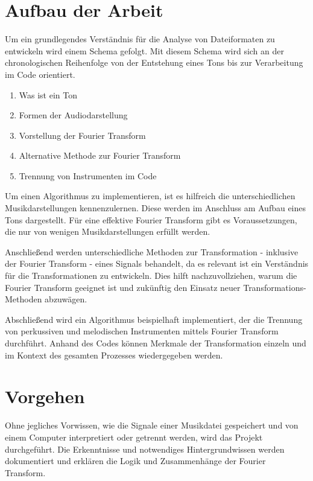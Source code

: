%
\section{Aufbau der Arbeit}
%

Um ein grundlegendes Verständnis für die Analyse von Dateiformaten zu entwickeln wird einem Schema gefolgt.
Mit diesem Schema wird sich an der chronologischen Reihenfolge von der Entstehung eines Tons bis zur Verarbeitung im Code orientiert.

%
\begin{enumerate}
    \item Was ist ein Ton
    \item Formen der Audiodarstellung
    \item Vorstellung der Fourier Transform
    \item Alternative Methode zur Fourier Transform
    \item Trennung von Instrumenten im Code
\end{enumerate}
%

Um einen Algorithmus zu implementieren, ist es hilfreich die unterschiedlichen Musikdarstellungen kennenzulernen.
Diese werden im Anschluss am Aufbau eines Tons dargestellt.
Für eine effektive Fourier Transform gibt es Voraussetzungen, die nur von wenigen Musikdarstellungen erfüllt werden.

\par

Anschließend werden unterschiedliche Methoden zur Transformation - inklusive der Fourier Transform - eines Signals behandelt, da es relevant ist ein Verständnis für die Transformationen zu entwickeln. Dies hilft nachzuvollziehen, warum die Fourier Transform geeignet ist und zukünftig den Einsatz neuer Transformations-Methoden abzuwägen.

\par

Abschließend wird ein Algorithmus beispielhaft implementiert, der die Trennung von perkussiven und melodischen Instrumenten mittels Fourier Transform durchführt. Anhand des Codes können Merkmale der Transformation einzeln und im Kontext des gesamten Prozesses wiedergegeben werden.

%
\section{Vorgehen}
%

Ohne jegliches Vorwissen, wie die Signale einer Musikdatei gespeichert und von einem Computer interpretiert oder getrennt werden, wird das Projekt durchgeführt. Die Erkenntnisse und notwendiges Hintergrundwissen werden dokumentiert und erklären die Logik und Zusammenhänge der Fourier Transform. 

